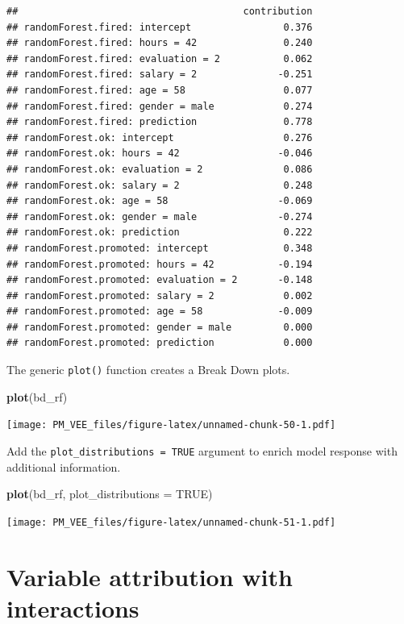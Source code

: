 \documentclass[12pt,]{krantz}
\newenvironment{Shaded}{\begin{snugshade}}{\end{snugshade}}
\newcommand{\DataTypeTok}[1]{\textcolor[rgb]{0.13,0.29,0.53}{#1}}
\newcommand{\KeywordTok}[1]{\textcolor[rgb]{0.13,0.29,0.53}{\textbf{#1}}}
\newcommand{\NormalTok}[1]{#1}
\newcommand{\OtherTok}[1]{\textcolor[rgb]{0.56,0.35,0.01}{#1}}
\theoremstyle{definition}
\theoremstyle{definition}
\theoremstyle{definition}
\theoremstyle{remark}
\begin{document}
\begin{verbatim}
##                                       contribution
## randomForest.fired: intercept                0.376
## randomForest.fired: hours = 42               0.240
## randomForest.fired: evaluation = 2           0.062
## randomForest.fired: salary = 2              -0.251
## randomForest.fired: age = 58                 0.077
## randomForest.fired: gender = male            0.274
## randomForest.fired: prediction               0.778
## randomForest.ok: intercept                   0.276
## randomForest.ok: hours = 42                 -0.046
## randomForest.ok: evaluation = 2              0.086
## randomForest.ok: salary = 2                  0.248
## randomForest.ok: age = 58                   -0.069
## randomForest.ok: gender = male              -0.274
## randomForest.ok: prediction                  0.222
## randomForest.promoted: intercept             0.348
## randomForest.promoted: hours = 42           -0.194
## randomForest.promoted: evaluation = 2       -0.148
## randomForest.promoted: salary = 2            0.002
## randomForest.promoted: age = 58             -0.009
## randomForest.promoted: gender = male         0.000
## randomForest.promoted: prediction            0.000
\end{verbatim}

The generic \texttt{plot()} function creates a Break Down plots.

\begin{Shaded}
\begin{Highlighting}[]
\KeywordTok{plot}\NormalTok{(bd_rf) }
\end{Highlighting}
\end{Shaded}

\texttt{[image: PM\_VEE\_files/figure-latex/unnamed-chunk-50-1.pdf]}

Add the \texttt{plot\_distributions\ =\ TRUE} argument to enrich model
response with additional information.

\begin{Shaded}
\begin{Highlighting}[]
\KeywordTok{plot}\NormalTok{(bd_rf, }\DataTypeTok{plot_distributions =} \OtherTok{TRUE}\NormalTok{) }
\end{Highlighting}
\end{Shaded}

\texttt{[image: PM\_VEE\_files/figure-latex/unnamed-chunk-51-1.pdf]}

\hypertarget{variable-attribution-with-interactions}{%
\section{Variable attribution with
interactions}\label{variable-attribution-with-interactions}}
\end{document}
